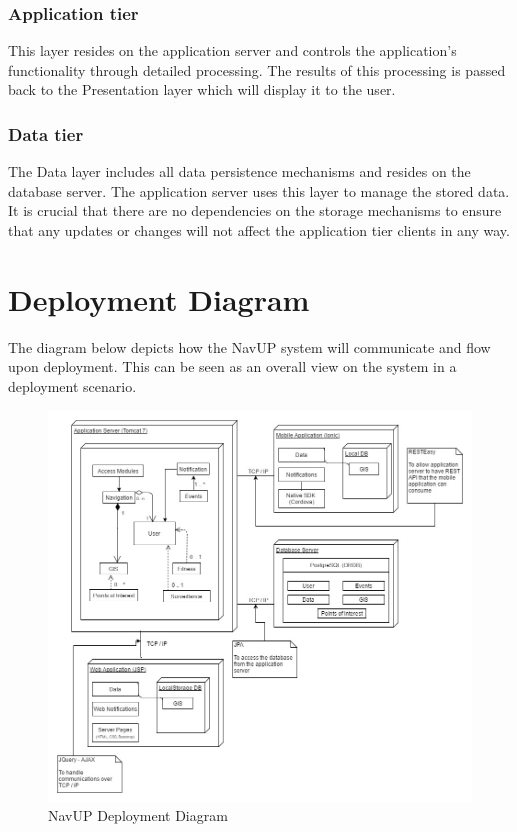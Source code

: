 \subsubsection{Application tier}
This layer resides on the application server and controls the application's functionality through detailed processing. The results of this processing is passed back to the Presentation layer which will display it to the user.

\subsubsection{Data tier}
The Data layer includes all data persistence mechanisms and resides on the database server. The application server uses this layer to manage the stored data. It is crucial that there are no dependencies on the storage mechanisms to ensure that any updates or changes will not affect the application tier clients in any way.

\pagebreak

\section{Deployment Diagram}
The diagram below depicts how the NavUP system will communicate and flow upon deployment. This can be seen as an overall view on the system in a deployment scenario.
\begin{figure}[H]
	
	\centering
	
	\includegraphics[width=\textwidth]{img/Deployment.jpg}
	
	\caption{NavUP Deployment Diagram}
	
	\end{figure}
\pagebreak